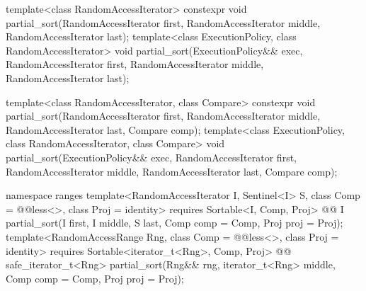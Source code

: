 %
\begin{itemdecl}
template<class RandomAccessIterator>
  constexpr void partial_sort(RandomAccessIterator first,
                              RandomAccessIterator middle,
                              RandomAccessIterator last);
template<class ExecutionPolicy, class RandomAccessIterator>
  void partial_sort(ExecutionPolicy&& exec,
                    RandomAccessIterator first,
                    RandomAccessIterator middle,
                    RandomAccessIterator last);

template<class RandomAccessIterator, class Compare>
  constexpr void partial_sort(RandomAccessIterator first,
                              RandomAccessIterator middle,
                              RandomAccessIterator last,
                              Compare comp);
template<class ExecutionPolicy, class RandomAccessIterator, class Compare>
  void partial_sort(ExecutionPolicy&& exec,
                    RandomAccessIterator first,
                    RandomAccessIterator middle,
                    RandomAccessIterator last,
                    Compare comp);
\end{itemdecl}
\begin{addedblock}
\begin{itemdecl}
namespace ranges {
  template<RandomAccessIterator I, Sentinel<I> S, class Comp = @@less<>,
      class Proj = identity>
    requires Sortable<I, Comp, Proj>
    @@ I
      partial_sort(I first, I middle, S last, Comp comp = Comp{}, Proj proj = Proj{});
  template<RandomAccessRange Rng, class Comp = @@less<>, class Proj = identity>
    requires Sortable<iterator_t<Rng>, Comp, Proj>
    @@ safe_iterator_t<Rng>
      partial_sort(Rng&& rng, iterator_t<Rng> middle, Comp comp = Comp{},
                   Proj proj = Proj{});
}
\end{itemdecl}
\end{addedblock}

